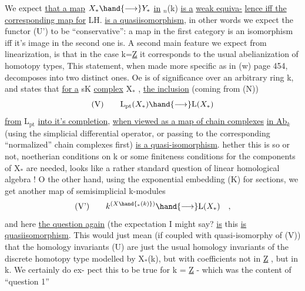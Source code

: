 We expect \uline{that a map} $X_{*} \hand{\longrightarrow} Y_{*}$ \uline{in} $_n$(k) \uline{is a}  \uline{weak equiva-}%
\uline{lence iff the corresponding map for} LH. \uline{is a quasiisomorphism}, in other
words we expect the functor (U') to be ``conservative'': a map in the
first category is an isomorphism iff it's image in the second one is.
A second main feature we expect from linearization, is that in the case
k=\underline{Z} it corresponds to the usual abelianization of homotopy types, This
statement, when made more specific as in (w) page 454, decomposes into
two distinct ones. Oe is of significance over an arbitrary ring k,
and states that \uline{for a} sK \uline{complex} X$_{*}$ , \uline{the inclusion} (coming from (N))
\[ \text{(V)} \qquad \mathrm{L}_{\mathrm{pt}}(X_{*}) \hand{\longrightarrow} \mathrm{L}(X_{*}) \] 
\uline{from} L$_{\mathrm{pt}}$ \uline{into it's completion}, \uline{when viewed as a map of chain complexes}
\uline{in Ab$_k$} (using the simplicial differential operator, or passing to the
corresponding ``normalized'' chain complexes first) \uline{is a quasi-isomorphism}.
hether this is  so or not,    noetherian conditions on k or some 
finiteness conditions for the components of X$_{*}$ are needed, looks like a
rather standard question of linear homological algebra ! O the other
hand, using the exponential embedding (K) for sections, we get another
map  of semisimplicial k-modules
\[ \text{(V')} \qquad k^{(X\hand{_{*}(k)})} \hand{\longrightarrow} \mathrm{L}(X_{*}) \quad , \] 
and here \uline{the question again} (the expectation I might say?\hand{)} \uline{is}   this
\uline{is   quasiisomorphism}. This would just mean  (if coupled with
quasi-isomorphy of (V)) that the homology invariants (U) are just the
usual homology invariants of the discrete homotopy type modelled by
X$_{*}$(k), but with coefficients not in \underline{Z} , but in k. We certainly do ex-%
pect this to be true for k = \underline{Z} - which was the content of ``question 1''


